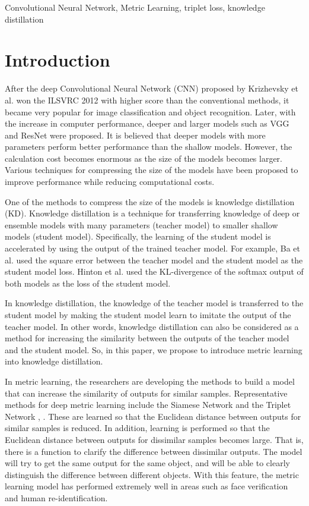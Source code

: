 \documentclass[conference]{IEEEtran}
\begin{document}
\begin{IEEEkeywords}
Convolutional Neural Network, Metric Learning, triplet loss, knowledge distillation
\end{IEEEkeywords}

\section{Introduction}
After the deep Convolutional Neural Network (CNN) proposed by Krizhevsky et al. \cite{Krizhevsky2012} won the ILSVRC 2012 with higher score than the conventional methods, it became very popular for image classification and object recognition. 
Later, with the increase in computer performance, deeper and larger models such as VGG \cite{Simonyan2014} and ResNet \cite{He2016} were proposed.
It is believed that deeper models with more parameters perform better performance than the shallow models.
However, the calculation cost becomes enormous as the size of the models becomes larger.
Various techniques for compressing the size of the models have been proposed to improve performance while reducing computational costs.

One of the methods to compress the size of the models is knowledge distillation (KD).
Knowledge distillation is a technique for transferring knowledge of deep or ensemble models with many parameters (teacher model) to smaller shallow models (student model).
Specifically, the learning of the student model is accelerated by using the output of the trained teacher model.
For example, Ba et al. \cite{Ba2014} used the square error between the teacher model and the student model as the student model loss.
Hinton et al. \cite{Hinton2015} used  the  KL-divergence  of  the  softmax  output  of  both  models  as  the  loss of the student model.

In knowledge distillation, the knowledge of the teacher model is transferred to the student model by making the student model learn to imitate the output of the teacher model.
In other words, knowledge distillation can also be considered as a method for increasing the similarity between the outputs of the teacher model and the student model.
So, in this paper, we propose to introduce metric learning into knowledge distillation.

In metric learning, the researchers are developing the methods to build a model that can increase the similarity of outputs for similar samples.
Representative methods for deep metric learning include the Siamese Network \cite{Bromely1994,Chopra2005,Hadsell2006} and the Triplet Network \cite{Wang2014}, \cite{Hoffer2015}.
These are learned so that the Euclidean distance between outputs for similar samples is reduced.
In addition, learning is performed so that the Euclidean distance between outputs for dissimilar samples becomes large.
That is, there is a function to clarify the difference between dissimilar outputs.
The model will try to get the same output for the same object, and will be able to clearly distinguish the difference between different objects.
With this feature, the metric learning model has performed extremely well in areas such as face verification and human re-identification.
\end{document}
